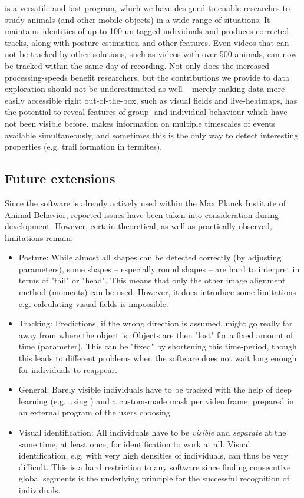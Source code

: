 \documentclass[9pt,lineno]{elife}
\newcommand{\TRex}{\protect\path{TRex}}
\begin{document}
\TRex{} is a versatile and fast program, which we have designed to enable researches to study animals (and other mobile objects) in a wide range of situations. It maintains identities of up to 100 un-tagged individuals and produces corrected tracks, along with posture estimation and other features. Even videos that can not be tracked by other solutions, such as videos with over 500 animals, can now be tracked within the same day of recording. Not only does the increased processing-speeds benefit researchers, but the contributions we provide to data exploration should not be underestimated as well -- merely making data more easily accessible right out-of-the-box, such as visual fields and live-heatmaps, has the potential to reveal features of group- and individual behaviour which have not been visible before. \TRex{} makes information on multiple timescales of events available simultaneously, and sometimes this is the only way to detect interesting properties (e.g. trail formation in termites).

\subsection{Future extensions}

Since the software is already actively used within the Max Planck Institute of Animal Behavior, reported issues have been taken into consideration during development. However, certain theoretical, as well as practically observed, limitations remain:

\begin{itemize}
	\item Posture: While almost all shapes can be detected correctly (by adjusting parameters), some shapes -- especially round shapes -- are hard to interpret in terms of "tail" or "head". This means that only the other image alignment method (moments) can be used. However, it does introduce some limitations e.g. calculating visual fields is impossible.
	\item Tracking: Predictions, if the wrong direction is assumed, might go really far away from where the object is. Objects are then "lost" for a fixed amount of time (parameter). This can be "fixed" by shortening this time-period, though this leads to different problems when the software does not wait long enough for individuals to reappear.
	\item General: Barely visible individuals have to be tracked with the help of deep learning (e.g. using \cite{Cae+17}) and a custom-made mask per video frame, prepared in an external program of the users choosing
	\item Visual identification: All individuals have to be \textit{visible} and \textit{separate} at the same time, at least once, for identification to work at all. Visual identification, e.g. with very high densities of individuals, can thus be very difficult. This is a hard restriction to any software since finding consecutive global segments is the underlying principle for the successful recognition of individuals.
\end{itemize}
\end{document}
